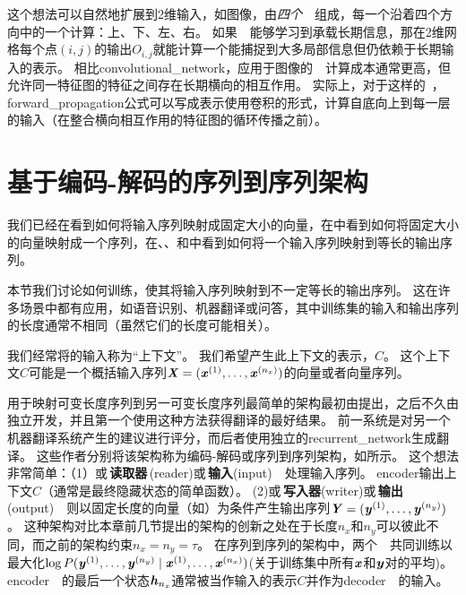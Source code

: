 这个想法可以自然地扩展到2维输入，如图像，由\emph{四个}~~组成，每一个沿着四个方向中的一个计算：上、下、左、右。
如果~~能够学习到承载长期信息，那在2维网格每个点$(i, j)$的输出$O_{i,j}$就能计算一个能捕捉到大多局部信息但仍依赖于长期输入的表示。
相比\gls{convolutional_network}，应用于图像的~~计算成本通常更高，但允许同一特征图的特征之间存在长期横向的相互作用\citep{Visin-et-al-arxiv2015-renet,kalchbrenner2015grid}。
实际上，对于这样的~，\gls{forward_propagation}公式可以写成表示使用卷积的形式，计算自底向上到每一层的输入（在整合横向相互作用的特征图的循环传播之前）。


\section{基于编码-解码的序列到序列架构}
\label{sec:encoder_decoder_sequence_to_sequence_architectures}
我们已经在看到如何将输入序列映射成固定大小的向量，在中看到如何将固定大小的向量映射成一个序列，在、、和中看到如何将一个输入序列映射到等长的输出序列。

本节我们讨论如何训练，使其将输入序列映射到不一定等长的输出序列。
这在许多场景中都有应用，如语音识别、机器翻译或问答，其中训练集的输入和输出序列的长度通常不相同（虽然它们的长度可能相关）。

我们经常将的输入称为``上下文''。
我们希望产生此上下文的表示，$C$。
这个上下文$C$可能是一个概括输入序列$\boldsymbol{\mathit{X}}=(\boldsymbol{\mathit{x}}^{(1)},\dots,\boldsymbol{\mathit{x}}^{(n_x)})$的向量或者向量序列。

用于映射可变长度序列到另一可变长度序列最简单的架构最初由\cite{cho-al-emnlp14}提出，之后不久由\cite{Sutskever-et-al-NIPS2014}独立开发，并且第一个使用这种方法获得翻译的最好结果。
前一系统是对另一个机器翻译系统产生的建议进行评分，而后者使用独立的\gls{recurrent_network}生成翻译。
这些作者分别将该架构称为编码-解码或序列到序列架构，如所示。
这个想法非常简单：（1）或\,\textbf{读取器}\,(reader)或\,\textbf{输入}(input)~~处理输入序列。
\gls{encoder}输出上下文$C$（通常是最终隐藏状态的简单函数）。
(2)或\,\textbf{写入器}(writer)或\,\textbf{输出}(output)~~则以固定长度的向量（如）为条件产生输出序列$\boldsymbol{\mathit{Y}}=(\boldsymbol{\mathit{y}}^{(1)}, \dots, \boldsymbol{\mathit{y}}^{(n_y)})$。
这种架构对比本章前几节提出的架构的创新之处在于长度$n_x$和$n_y$可以彼此不同，而之前的架构约束$n_x = n_y = \tau$。
在序列到序列的架构中，两个~~共同训练以最大化$\log P( \boldsymbol{\mathit{y}}^{(1)}, \dots, \boldsymbol{\mathit{y}}^{(n_y)} \mid \boldsymbol{\mathit{x}}^{(1)},\dots,\boldsymbol{\mathit{x}}^{(n_x)} )$(关于训练集中所有$\boldsymbol{\mathit{x}}$和$\boldsymbol{\mathit{y}}$对的平均)。
\gls{encoder}~~的最后一个状态$\boldsymbol{\mathit{h}}_{n_x}$通常被当作输入的表示$C$并作为\gls{decoder}~~的输入。

